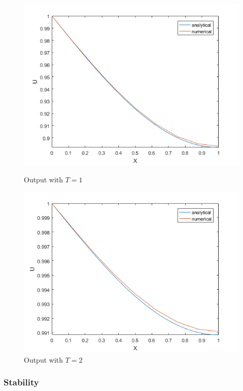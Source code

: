 \documentclass[10pt,a4paper]{report}
\begin{document}
\begin{figure}[ht]
\begin{minipage}[b]{0.5\linewidth}
\centering
\includegraphics[width=\textwidth]{3ii1}
\caption{Output with $T=1$}
\end{minipage}
\hspace{0.5cm}
\begin{minipage}[b]{0.5\linewidth}
\centering
\includegraphics[width=\textwidth]{3ii2}
\caption{Output with $T=2$}
\end{minipage}
\end{figure}

\newpage

\subsubsection{Stability}
\end{document}
